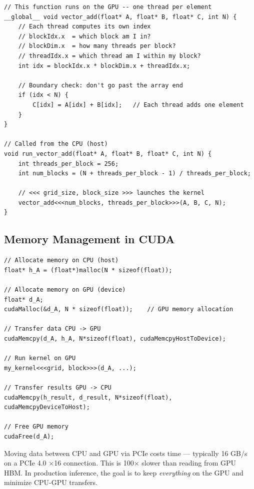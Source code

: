 \documentclass[11pt, twoside, openright]{book}
\newcommand{\notebox}[2]{\begin{tcolorbox}[notestyle, title={#1}]#2\end{tcolorbox}}
\begin{document}
\begin{lstlisting}[style=cstyle, caption={A simple CUDA vector addition kernel},
                   label={lst:cuda_add}]
// This function runs on the GPU -- one thread per element
__global__ void vector_add(float* A, float* B, float* C, int N) {
    // Each thread computes its own index
    // blockIdx.x  = which block am I in?
    // blockDim.x  = how many threads per block?
    // threadIdx.x = which thread am I within my block?
    int idx = blockIdx.x * blockDim.x + threadIdx.x;

    // Boundary check: don't go past the array end
    if (idx < N) {
        C[idx] = A[idx] + B[idx];   // Each thread adds one element
    }
}

// Called from the CPU (host)
void run_vector_add(float* A, float* B, float* C, int N) {
    int threads_per_block = 256;
    int num_blocks = (N + threads_per_block - 1) / threads_per_block;

    // <<< grid_size, block_size >>> launches the kernel
    vector_add<<<num_blocks, threads_per_block>>>(A, B, C, N);
}
\end{lstlisting}

\subsection{Memory Management in CUDA}

\begin{lstlisting}[style=cstyle, caption={CUDA memory allocation and transfer}]
// Allocate memory on CPU (host)
float* h_A = (float*)malloc(N * sizeof(float));

// Allocate memory on GPU (device)
float* d_A;
cudaMalloc(&d_A, N * sizeof(float));    // GPU memory allocation

// Transfer data CPU -> GPU
cudaMemcpy(d_A, h_A, N*sizeof(float), cudaMemcpyHostToDevice);

// Run kernel on GPU
my_kernel<<<grid, block>>>(d_A, ...);

// Transfer results GPU -> CPU
cudaMemcpy(h_result, d_result, N*sizeof(float), cudaMemcpyDeviceToHost);

// Free GPU memory
cudaFree(d_A);
\end{lstlisting}

\notebox{Memory Transfer is Expensive}{
Moving data between CPU and GPU via PCIe costs time --- typically 16 GB/s on a
PCIe 4.0 $\times$16 connection.  This is 100$\times$ slower than reading from GPU
HBM.  In production inference, the goal is to keep \emph{everything} on the GPU
and minimize CPU-GPU transfers.
}
\end{document}
